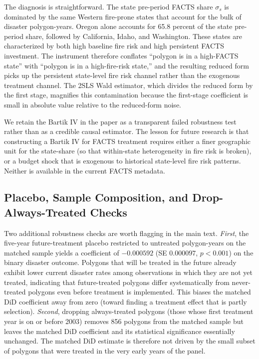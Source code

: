 \documentclass[12pt, letterpaper]{article}
\begin{document}
The diagnosis is straightforward. The state pre-period FACTS share $\sigma_s$ is dominated by the same Western fire-prone states that account for the bulk of disaster polygon-years. Oregon alone accounts for 65.8 percent of the state pre-period share, followed by California, Idaho, and Washington. These states are characterized by both high baseline fire risk and high persistent FACTS investment. The instrument therefore conflates ``polygon is in a high-FACTS state'' with ``polygon is in a high-fire-risk state,'' and the resulting reduced form picks up the persistent state-level fire risk channel rather than the exogenous treatment channel. The 2SLS Wald estimator, which divides the reduced form by the first stage, magnifies this contamination because the first-stage coefficient is small in absolute value relative to the reduced-form noise.

We retain the Bartik IV in the paper as a transparent failed robustness test rather than as a credible causal estimator. The lesson for future research is that constructing a Bartik IV for FACTS treatment requires either a finer geographic unit for the state-share (so that within-state heterogeneity in fire risk is broken), or a budget shock that is exogenous to historical state-level fire risk patterns. Neither is available in the current FACTS metadata.

\subsection{Placebo, Sample Composition, and Drop-Always-Treated Checks}

Two additional robustness checks are worth flagging in the main text. \textit{First}, the five-year future-treatment placebo restricted to untreated polygon-years on the matched sample yields a coefficient of $-0.000592$ (SE $0.000097$, $p < 0.001$) on the binary disaster outcome. Polygons that will be treated in the future already exhibit lower current disaster rates among observations in which they are not yet treated, indicating that future-treated polygons differ systematically from never-treated polygons even before treatment is implemented. This biases the matched DiD coefficient away from zero (toward finding a treatment effect that is partly selection). \textit{Second}, dropping always-treated polygons (those whose first treatment year is on or before 2003) removes 856 polygons from the matched sample but leaves the matched DiD coefficient and its statistical significance essentially unchanged. The matched DiD estimate is therefore not driven by the small subset of polygons that were treated in the very early years of the panel.
\end{document}
